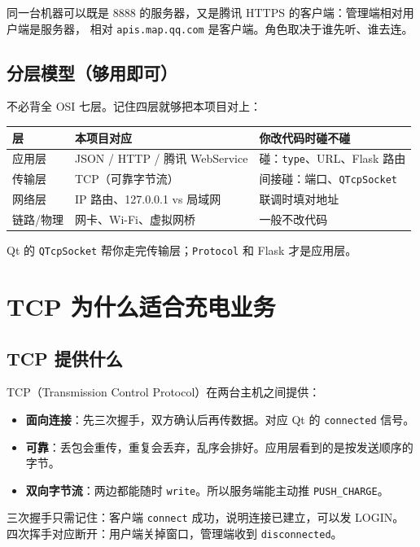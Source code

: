 \documentclass[UTF8,a4paper,11pt]{ctexart}
\begin{document}
同一台机器可以既是 8888 的服务器，又是腾讯 HTTPS 的客户端：管理端相对用户端是服务器，
相对 \texttt{apis.map.qq.com} 是客户端。角色取决于谁先听、谁去连。

\subsection{分层模型（够用即可）}

不必背全 OSI 七层。记住四层就够把本项目对上：

\begin{center}
\begin{tabular}{lll}
\toprule
层 & 本项目对应 & 你改代码时碰不碰 \\
\midrule
应用层 & JSON / HTTP / 腾讯 WebService & 碰：\texttt{type}、URL、Flask 路由 \\
传输层 & TCP（可靠字节流） & 间接碰：端口、\texttt{QTcpSocket} \\
网络层 & IP 路由、127.0.0.1 vs 局域网 & 联调时填对地址 \\
链路/物理 & 网卡、Wi-Fi、虚拟网桥 & 一般不改代码 \\
\bottomrule
\end{tabular}
\end{center}

Qt 的 \texttt{QTcpSocket} 帮你走完传输层；\texttt{Protocol} 和 Flask 才是应用层。

\section{TCP 为什么适合充电业务}

\subsection{TCP 提供什么}

TCP（Transmission Control Protocol）在两台主机之间提供：

\begin{itemize}[leftmargin=1.4em]
  \item \textbf{面向连接}：先三次握手，双方确认后再传数据。对应 Qt 的 \texttt{connected} 信号。
  \item \textbf{可靠}：丢包会重传，重复会丢弃，乱序会排好。应用层看到的是按发送顺序的字节。
  \item \textbf{双向字节流}：两边都能随时 \texttt{write}。所以服务端能主动推 \texttt{PUSH\_CHARGE}。
\end{itemize}

三次握手只需记住：客户端 \texttt{connect} 成功，说明连接已建立，可以发 LOGIN。
四次挥手对应断开：用户端关掉窗口，管理端收到 \texttt{disconnected}。
\end{document}
